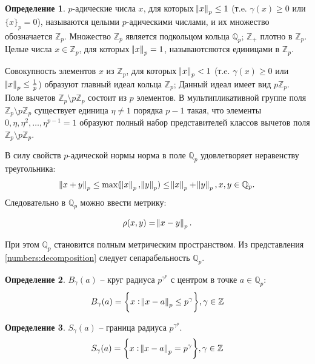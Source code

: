 \documentclass[master, och, diploma, times]{sty/SCWorks}
\theoremstyle{plain}
\theoremstyle{definition}
\newtheorem{defn}{Определение}[section]
\begin{document}
\begin{defn}
$p$-адические числа $x$, для которых $\norm{x}_p \le 1$ (т.e. $\gamma(x) \ge 0$ или $\{x\}_p=0$), называются целыми $p$-адическими числами, и их множество обозначается $\mathbb {Z}_p$. Множество $\mathbb {Z}_p$ является подкольцом кольца $\mathbb {Q}_p$; $\mathbb {Z}_+$ плотно в $\mathbb {Z}_p$. Целые числа $x \in \mathbb {Z}_p$, для которых $\norm{x}_p=1$, называютсяются единицами в $\mathbb {Z}_p$. \cite{bib:analysis:vladimirov}
\end{defn}

Совокупность элементов $x$ из $\mathbb {Z}_p$, для которых $\norm{x}_p < 1$ (т.e. $\gamma(x) \ge 0$ или $\norm{x}_p \le \frac{1}{p}$) образуют главный идеал кольца $\mathbb {Z}_p$; Данный идеал имеет вид $p\mathbb {Z}_p$. Поле вычетов $\mathbb {Z}_p \setminus p\mathbb {Z}_p$ состоит из $p$ элементов. В мультипликативной группе поля $\mathbb {Z}_p \setminus p\mathbb {Z}_p$ существует единица $\eta \ne 1$ порядка $p-1$ такая, что элементы $0, \eta, \eta^2, \dots, \eta^{p-1} = 1$ образуют полный набор представителей классов вычетов поля $\mathbb {Z}_p \setminus p\mathbb {Z}_p$.

В силу свойств $p$-адической нормы норма в поле $\mathbb {Q}_p$ удовлетворяет неравенству треугольника:
$$\norm{x + y}_p \le \max(\norm{x}_p, \norm{y}_p) \le \norm{x}_p + \norm{y}_p, x,y \in \mathbb {Q}_p.$$
\noindent Следовательно в $\mathbb {Q}_p$ можно ввести метрику:

\begin{equation}
	\rho (x,y)=\norm{x-y}_p.
\end{equation}

\noindent При этом $\mathbb {Q}_p$ становится полным метрическим пространством. Из представления \eqref{numbers:decomposition} следует сепарабельность $\mathbb {Q}_p$.  

\begin{defn}
$B_{\gamma}(a)$ -- круг радиуса $p^{\gamma^p}$ с центром в точке $a \in \mathbb {Q}_p$:
\begin{equation}
	B_\gamma(a) = \bigg\{x: \norm{x-a}_p \le p^{\gamma} \bigg\}, \gamma \in \mathbb {Z}
\end{equation}
\end{defn}

\begin{defn}
$S_{\gamma}(a)$ -- граница радиуса $p^{\gamma^p}$.
\begin{equation}
	S_\gamma(a) = \bigg\{x: \norm{x-a}_p = p^{\gamma} \bigg\}, \gamma \in \mathbb {Z}
\end{equation}
\end{defn}
\end{document}
